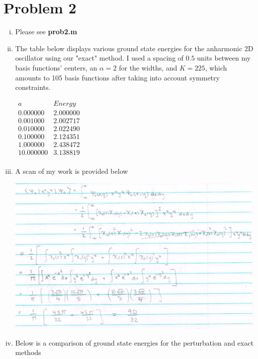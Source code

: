 \documentclass{article}
\begin{document}
\section*{Problem 2}
\begin{enumerate}[i)]
  \item Please see \textbf{prob2.m}
  \item The table below displays various ground state energies for the anharmonic 2D oscillator using our "exact" method. I used a spacing of $0.5$ units between my basis functions' centers, an $\alpha=2$ for the widths, and $K=225$, which amounts to 105 basis functions after taking into account symmetry constraints.
    \begin{center}
      $\begin{array}{c|c}
        a & Energy \\ \hline
        0.000000 & 2.000000 \\ 
        0.001000 & 2.002717 \\ 
        0.010000 & 2.022490 \\ 
        0.100000 & 2.124351 \\ 
        1.000000 & 2.438472 \\ 
        10.000000 & 3.138819 \\ 
      \end{array}$
    \end{center}
  \item A scan of my work is provided below
    \begin{center}
      \includegraphics[scale=0.5]{prob2part3}
    \end{center}
  \item Below is a comparison of ground state energies for the perturbation and exact methods


\end{enumerate}
\end{document}
